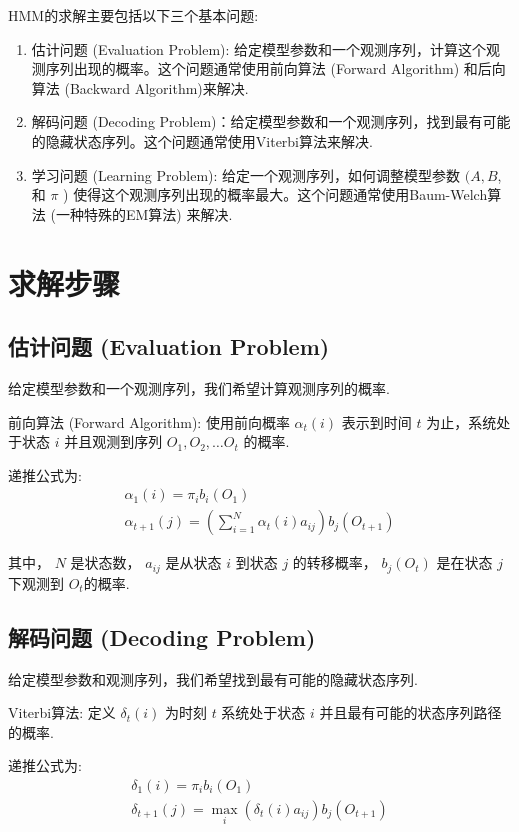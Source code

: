 \documentclass[UTF8,12pt]{ctexart}
\numberwithin{equation}{section}%
\begin{document}
	HMM的求解主要包括以下三个基本问题:
	\begin{enumerate}
		\item 估计问题 (Evaluation Problem): 给定模型参数和一个观测序列，计算这个观测序列出现的概率。这个问题通常使用前向算法 (Forward Algorithm) 和后向算法 (Backward Algorithm)来解决.
		\item 解码问题 (Decoding Problem)：给定模型参数和一个观测序列，找到最有可能的隐藏状态序列。这个问题通常使用Viterbi算法来解决.
		\item 学习问题 (Learning Problem): 给定一个观测序列，如何调整模型参数 $(A, B$, 和 $\pi$ ) 使得这个观测序列出现的概率最大。这个问题通常使用Baum-Welch算法 (一种特殊的EM算法) 来解决.
	\end{enumerate}
	\section{求解步骤}
	\subsection{估计问题 (Evaluation Problem)}
	
	给定模型参数和一个观测序列，我们希望计算观测序列的概率.
	
	前向算法 (Forward Algorithm):
	使用前向概率 $\alpha_t(i)$ 表示到时间 $t$ 为止，系统处于状态 $i$ 并且观测到序列 $O_1, O_2, \ldots O_t$ 的概率.
	
	递推公式为:
	$$
	\begin{gathered}
		\alpha_1(i)=\pi_i b_i\left(O_1\right) \\
		\alpha_{t+1}(j)=\left(\sum_{i=1}^N \alpha_t(i) a_{i j}\right) b_j\left(O_{t+1}\right)
	\end{gathered}
	$$
	
	其中， $N$ 是状态数， $a_{i j}$ 是从状态 $i$ 到状态 $j$ 的转移概率， $b_j\left(O_t\right)$ 是在状态 $j$ 下观测到 $O_t$的概率.
	
	\subsection{解码问题 (Decoding Problem)}
	
	给定模型参数和观测序列，我们希望找到最有可能的隐藏状态序列.
	
	Viterbi算法:
	定义 $\delta_t(i)$ 为时刻 $t$ 系统处于状态 $i$ 并且最有可能的状态序列路径的概率.
	
	递推公式为:
	$$
	\begin{gathered}
		\delta_1(i)=\pi_i b_i\left(O_1\right) \\
		\delta_{t+1}(j)=\max _i\left(\delta_t(i) a_{i j}\right) b_j\left(O_{t+1}\right)
	\end{gathered}
	$$
\end{document}

